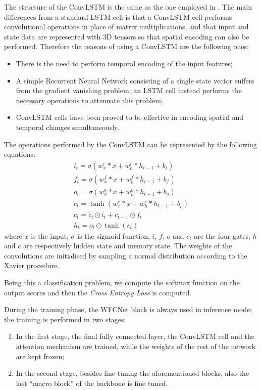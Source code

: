 \documentclass[10pt,twocolumn,letterpaper]{article}
\begin{document}
The structure of the ConvLSTM is the same as the one employed in \cite{Ego-RNN}. The main differences from a standard LSTM cell is that a ConvLSTM cell performs convolutional operations in place of matrix multiplications, and that input and state data are represented with 3D tensors so that spatial encoding can also be performed.
Therefore the reasons of using a ConvLSTM are the following ones:
\begin{itemize}
	\item There is the need to perform temporal encoding of the input features;
	\item A simple Recurrent Neural Network consisting of a single state vector suffers from the gradient vanishing problem; an LSTM cell instead performs the necessary operations to attenuate this problem;
	\item ConvLSTM cells have been proved to be effective in encoding spatial and temporal changes simultaneously.
\end{itemize}
The operations performed by the ConvLSTM can be represented by the following equations:
\begin{equation*}
\begin{gathered}
i_t = \sigma(w_x^i * x + w_h^i * h_{t-1} + b_i) \\
f_t = \sigma(w_x^f * x + w_h^f * h_{t-1} + b_f) \\
o_t = \sigma(w_x^o * x + w_h^o * h_{t-1} + b_o)\\
\tilde{c}_t = \tanh(w_x^c * x + w_h^c * h_{t-1} + b_{\tilde{c}}) \\
c_t = \tilde{c}_t \odot i_t + c_{t-1} \odot f_t \\
h_t = o_t \odot \tanh(c_t)
\end{gathered}
\end{equation*}
where $x$ is the input, $\sigma$ is the sigmoid function, $i$, $f$, $o$ and $\tilde{c}_t$ are the four gates, $h$ and $c$ are respectively hidden state and memory state.
The weights of the convolutions are initialised by sampling a normal distribution according to the Xavier procedure.

Being this a classification problem, we compute the softmax function on the output scores and then the \textit{Cross Entropy Loss} is computed.

During the training phase, the WFCNet block is always used in inference mode; the training is performed in two stages:
\begin{enumerate}
	\item In the first stage, the final fully connected layer, the ConvLSTM cell and the attention mechanism are trained, while the weights of the rest of the network are kept frozen;
	\item In the second stage, besides fine tuning the aforementioned blocks, also the last ``macro block'' of the backbone is fine tuned.
\end{enumerate}
\end{document}
